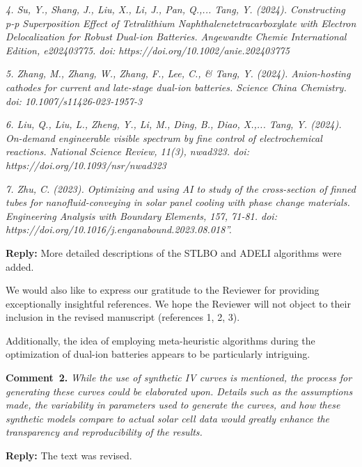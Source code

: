 \documentclass[a4paper,fleqn]{cas-sc}
\begin{document}
\emph{
4. Su, Y., Shang, J., Liu, X., Li, J., Pan, Q.,... Tang, Y. (2024).
Constructing p-p Superposition Effect of Tetralithium Naphthalenetetracarboxylate
with Electron Delocalization for Robust Dual-ion Batteries.
Angewandte Chemie International Edition, e202403775.
doi: https://doi.org/10.1002/anie.202403775
}

\emph{
5. Zhang, M., Zhang, W., Zhang, F., Lee, C., \& Tang, Y. (2024).
Anion-hosting cathodes for current and late-stage dual-ion batteries.
Science China Chemistry.
doi: 10.1007/s11426-023-1957-3
}

\emph{
6. Liu, Q., Liu, L., Zheng, Y., Li, M., Ding, B., Diao, X.,... Tang, Y. (2024).
On-demand engineerable visible spectrum by fine control of electrochemical reactions.
National Science Review, 11(3), nwad323.
doi: https://doi.org/10.1093/nsr/nwad323
}

\emph{
7. Zhu, C. (2023).
Optimizing and using AI to study of the cross-section of finned
tubes for nanofluid-conveying in solar panel cooling with phase change materials.
Engineering Analysis with Boundary Elements, 157, 71-81.
doi: https://doi.org/10.1016/j.enganabound.2023.08.018''.
}

\noindent
\textcolor[rgb]{0.51,0.00,0.00}{\textbf{Reply:}}
More detailed descriptions of the STLBO and ADELI algorithms were added.

We would also like to express our gratitude to the Reviewer for providing exceptionally insightful references. 
We hope the Reviewer will not object to their inclusion in the revised manuscript (references 1, 2, 3).

Additionally, the idea of employing meta-heuristic algorithms during the optimization of dual-ion batteries appears to be particularly intriguing.







\vspace{1cm}
\noindent
\textcolor[rgb]{0.00,0.50,1.00}{\textbf{Comment~2.}}
\emph{While the use of synthetic IV curves is mentioned, the process for generating
these curves could be elaborated upon.
Details such as the assumptions made, the variability in parameters used to generate the curves,
and how these synthetic models compare to actual solar cell data would greatly enhance the transparency and reproducibility of the results.}

\noindent
\textcolor[rgb]{0.51,0.00,0.00}{\textbf{Reply:}}
The text was revised.
\end{document}
